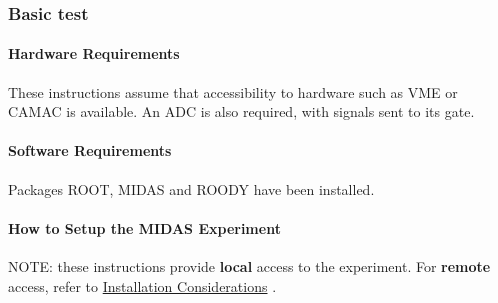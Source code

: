  \hypertarget{Q_Linux_Q_Linux_Basic_Test}{}\subsubsection{Basic test}\label{Q_Linux_Q_Linux_Basic_Test}
\hypertarget{Q_Linux_Q_Linux_Hardware_Requirements}{}\paragraph{Hardware Requirements}\label{Q_Linux_Q_Linux_Hardware_Requirements}
These instructions assume that accessibility to hardware such as VME or CAMAC is available. An ADC is also required, with signals sent to its gate.\hypertarget{Q_Linux_Q_Linux_Software_Requirements}{}\paragraph{Software Requirements}\label{Q_Linux_Q_Linux_Software_Requirements}
Packages ROOT, MIDAS and ROODY have been installed.\hypertarget{Q_Linux_Q_Linux_Expt_Setup}{}\paragraph{How to Setup the MIDAS Experiment}\label{Q_Linux_Q_Linux_Expt_Setup}
NOTE: these instructions provide {\bfseries local} access to the experiment. For {\bfseries remote} access, refer to \hyperlink{Q_Linux_Q_Linux_Installation_Considerations}{Installation Considerations} .


